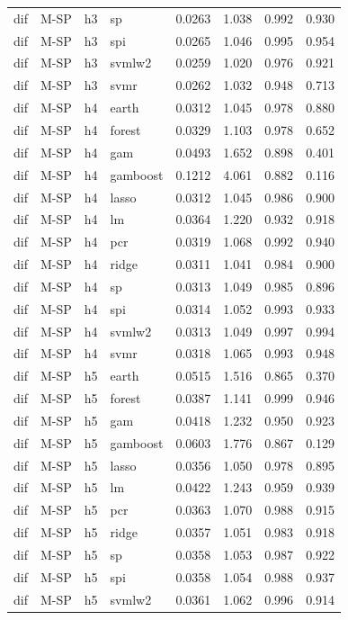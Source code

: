 \begin{ThreePartTable}
\begin{longtable}[t]{llclcccc}
dif & M-SP & h3 & sp & 0.0263 & 1.038 & 0.992 & 0.930\\
dif & M-SP & h3 & spi & 0.0265 & 1.046 & 0.995 & 0.954\\
dif & M-SP & h3 & svmlw2 & 0.0259 & 1.020 & 0.976 & 0.921\\
dif & M-SP & h3 & svmr & 0.0262 & 1.032 & 0.948 & 0.713\\
\addlinespace
dif & M-SP & h4 & earth & 0.0312 & 1.045 & 0.978 & 0.880\\
dif & M-SP & h4 & forest & 0.0329 & 1.103 & 0.978 & 0.652\\
dif & M-SP & h4 & gam & 0.0493 & 1.652 & 0.898 & 0.401\\
dif & M-SP & h4 & gamboost & 0.1212 & 4.061 & 0.882 & 0.116\\
dif & M-SP & h4 & lasso & 0.0312 & 1.045 & 0.986 & 0.900\\
dif & M-SP & h4 & lm & 0.0364 & 1.220 & 0.932 & 0.918\\
dif & M-SP & h4 & pcr & 0.0319 & 1.068 & 0.992 & 0.940\\
dif & M-SP & h4 & ridge & 0.0311 & 1.041 & 0.984 & 0.900\\
dif & M-SP & h4 & sp & 0.0313 & 1.049 & 0.985 & 0.896\\
dif & M-SP & h4 & spi & 0.0314 & 1.052 & 0.993 & 0.933\\
dif & M-SP & h4 & svmlw2 & 0.0313 & 1.049 & 0.997 & 0.994\\
dif & M-SP & h4 & svmr & 0.0318 & 1.065 & 0.993 & 0.948\\
\addlinespace
dif & M-SP & h5 & earth & 0.0515 & 1.516 & 0.865 & 0.370\\
dif & M-SP & h5 & forest & 0.0387 & 1.141 & 0.999 & 0.946\\
dif & M-SP & h5 & gam & 0.0418 & 1.232 & 0.950 & 0.923\\
dif & M-SP & h5 & gamboost & 0.0603 & 1.776 & 0.867 & 0.129\\
dif & M-SP & h5 & lasso & 0.0356 & 1.050 & 0.978 & 0.895\\
dif & M-SP & h5 & lm & 0.0422 & 1.243 & 0.959 & 0.939\\
dif & M-SP & h5 & pcr & 0.0363 & 1.070 & 0.988 & 0.915\\
dif & M-SP & h5 & ridge & 0.0357 & 1.051 & 0.983 & 0.918\\
dif & M-SP & h5 & sp & 0.0358 & 1.053 & 0.987 & 0.922\\
dif & M-SP & h5 & spi & 0.0358 & 1.054 & 0.988 & 0.937\\
dif & M-SP & h5 & svmlw2 & 0.0361 & 1.062 & 0.996 & 0.914\\

\end{longtable}
\end{ThreePartTable}
